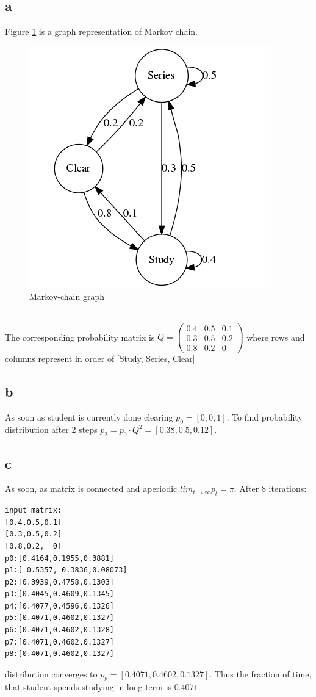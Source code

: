\subsection*{a}
Figure \ref{fig:MC} is a graph representation of Markov chain.\\
\begin{figure}[h!]
	\centering
	\includegraphics[width=0.5\linewidth]{task5-graph.png}
	\caption{Markov-chain graph}
	\label{fig:MC}
\end{figure}\\
The corresponding probability matrix is $Q = 
\begin{pmatrix}
	0.4 & 0.5 & 0.1 \\
	0.3 & 0.5 & 0.2 \\
	0.8 & 0.2 & 0
\end{pmatrix}
$
where rows and columns represent in order of [Study, Series, Clear]
\subsection*{b}
As soon as student is currently done clearing $p_0 = [0, 0, 1]$. To find probability distribution after 2 steps
$p_2 = p_0\cdot Q^2 = [0.38, 0.5, 0.12]$. 
\subsection*{c}
As soon, as matrix is connected and aperiodic $lim_{t\to \infty}p_t = \pi$. After 8 iterations:
\begin{verbatim}
input matrix:
[0.4,0.5,0.1]
[0.3,0.5,0.2]
[0.8,0.2,  0]
p0:[0.4164,0.1955,0.3881]
p1:[ 0.5357, 0.3836,0.08073]
p2:[0.3939,0.4758,0.1303]
p3:[0.4045,0.4609,0.1345]
p4:[0.4077,0.4596,0.1326]
p5:[0.4071,0.4602,0.1327]
p6:[0.4071,0.4602,0.1328]
p7:[0.4071,0.4602,0.1327]
p8:[0.4071,0.4602,0.1327]
\end{verbatim}
distribution converges to $p_8 = [0.4071,0.4602,0.1327]$. Thus the fraction of time, that student spends studying in long term is $0.4071$.